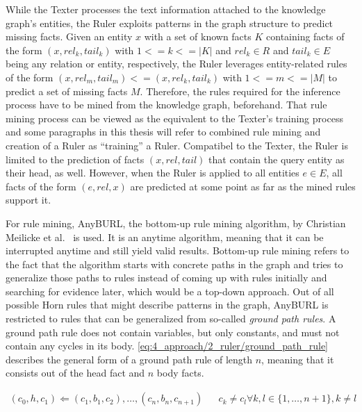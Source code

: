 While the Texter processes the text information attached to the knowledge graph's entities, the Ruler exploits patterns in the graph structure to predict missing facts. Given an entity $x$ with a set of known facts $K$ containing facts of the form $(x, rel_k, tail_k)$ with $1 <= k <= |K|$ and $rel_k \in R$ and $tail_k \in E$ being any relation or entity, respectively, the Ruler leverages entity-related rules of the form $(x, rel_m, tail_m) <= (x, rel_k, tail_k)$ with $1 <= m <= |M|$ to predict a set of missing facts $M$. Therefore, the rules required for the inference process have to be mined from the knowledge graph, beforehand. That rule mining process can be viewed as the equivalent to the Texter's training process and some paragraphs in this thesis will refer to combined rule mining and creation of a Ruler as ``training'' a Ruler. Compatibel to the Texter, the Ruler is limited to the prediction of facts $(x, rel, tail)$ that contain the query entity as their head, as well. However, when the Ruler is applied to all entities $e \in E$, all facts of the form $(e, rel, x)$ are predicted at some point as far as the mined rules support it.

For rule mining, AnyBURL, the bottom-up rule mining algorithm, by Christian Meilicke et al.~\cite{Meilicke2019AnytimeBR} is used. It is an anytime algorithm, meaning that it can be interrupted anytime and still yield valid results. Bottom-up rule mining refers to the fact that the algorithm starts with concrete paths in the graph and tries to generalize those paths to rules instead of coming up with rules initially and searching for evidence later, which would be a top-down approach. Out of all possible Horn rules that might describe patterns in the graph, AnyBURL is restricted to rules that can be generalized from so-called \emph{ground path rules}. A ground path rule does not contain variables, but only constants, and must not contain any cycles in its body. \autoref{eq:4_approach/2_ruler/ground_path_rule} describes the general form of a ground path rule of length $n$, meaning that it consists out of the head fact and $n$ body facts.

\begin{align}
(c_0, h, c_1)
    \Leftarrow (c_1, b_1, c_2), \dots, (c_n, b_n, c_{n+1}) &&
    c_k \neq c_l \forall k, l \in \{1, \dots, n+1\}, k \ne l
    \label{eq:4_approach/2_ruler/ground_path_rule}
\end{align}

